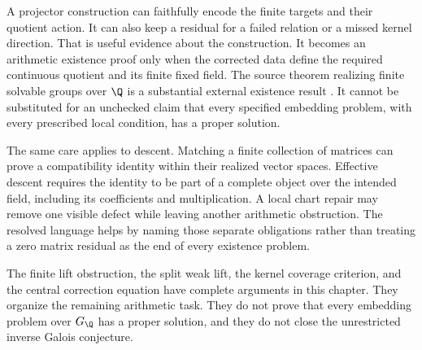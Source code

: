 A projector construction can faithfully encode the finite targets and their quotient action. It can also keep a residual for a failed relation or a missed kernel direction. That is useful evidence about the construction. It becomes an arithmetic existence proof only when the corrected data define the required continuous quotient and its finite fixed field. The source theorem realizing finite solvable groups over \(\Q\) is a substantial external existence result \cite[Theorem 1]{SchmidtWingberg1998}. It cannot be substituted for an unchecked claim that every specified embedding problem, with every prescribed local condition, has a proper solution.

The same care applies to descent. Matching a finite collection of matrices can prove a compatibility identity within their realized vector spaces. Effective descent requires the identity to be part of a complete object over the intended field, including its coefficients and multiplication. A local chart repair may remove one visible defect while leaving another arithmetic obstruction. The resolved language helps by naming those separate obligations rather than treating a zero matrix residual as the end of every existence problem.

\begin{claimboundary}
The finite lift obstruction, the split weak lift, the kernel coverage criterion, and the central correction equation have complete arguments in this chapter. They organize the remaining arithmetic task. They do not prove that every embedding problem over \(G_{\Q}\) has a proper solution, and they do not close the unrestricted inverse Galois conjecture.
\end{claimboundary}
